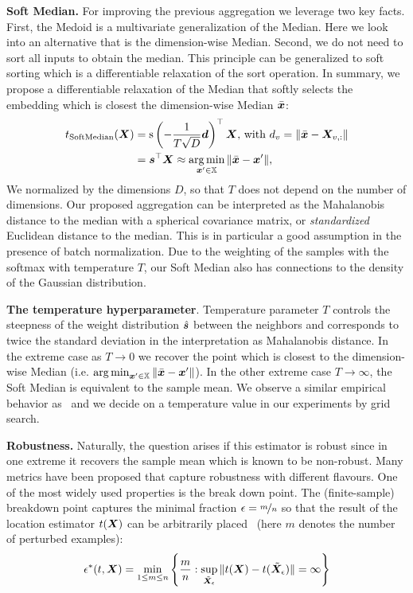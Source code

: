 \documentclass[sigconf, review]{acmart}
\newcommand{\features}{\mX}
\newcommand{\featset}{\sX}
\newcommand{\softout}{\vs}
\newcommand{\pertm}{\tilde{\mX}_\epsilon}
\begin{document}
\textbf{Soft Median.} For improving the previous aggregation we leverage two key facts. First, the Medoid is a multivariate generalization of the Median. Here we look into an alternative that is the dimension-wise Median. Second, we do not need to sort all inputs to obtain the median. This principle can be generalized to soft sorting which is a differentiable relaxation of the sort operation. In summary, we propose a differentiable relaxation of the Median that softly selects the embedding which is closest the dimension-wise Median \(\bar{{\bm{x}}}\):
\begin{equation}\label{eq:softmedian}
  \begin{aligned}
  t_{\text{SoftMedian}}(\features)
  &= \text{s}\left(-\frac{1}{T\sqrt{D}} \vd \right)^\top \features \text{,~with}~\evd_{v} = \|\bar{\vx} - \features_{v,:}\| \\
  &= \softout^\top\features \approx \argmin_{\vx' \in \featset} \| \bar{\vx} - \vx' \|,
  \end{aligned}
\end{equation}
We normalized by the dimensions \(D\), so that \(T\) does not depend on the number of dimensions. Our proposed aggregation can be interpreted as the Mahalanobis distance to the median with a spherical covariance matrix, or \emph{standardized} Euclidean distance to the median. This is in particular a good assumption in the presence of batch normalization. Due to the weighting of the samples with the softmax with temperature $T$, our Soft Median also has connections to the density of the Gaussian distribution.

\textbf{The temperature hyperparameter}. Temperature parameter $T$ controls the steepness of the weight distribution $\hat{\softout}$ between the neighbors and corresponds to twice the standard deviation in the interpretation as Mahalanobis distance. In the extreme case as $T \to 0$ we recover the point which is closest to the dimension-wise Median (i.e. \(\argmin_{\vx' \in \featset} \| \bar{\vx} - \vx' \|\)). In the other extreme case $T\to\infty$, the Soft Median is equivalent to the sample mean. We observe a similar empirical behavior as~\citet{Geisler2020} and we decide on a temperature value in our experiments by grid search.

\textbf{Robustness.} Naturally, the question arises if this estimator is robust since in one extreme it recovers the sample mean which is known to be non-robust. Many metrics have been proposed that capture robustness with different flavours. One of the most widely used properties is the break down point. The (finite-sample) breakdown point captures the minimal fraction \(\epsilon = \nicefrac{m}{n}\) so that the result of the location estimator \(t(\features)\) can be arbitrarily placed~\citep{Donoho1983} (here \(m\) denotes the number of perturbed examples):
%
\begin{equation}\label{eq:breakdown}
  \epsilon^*(t, \features) = \min_{1 \le m \le n} \left \{ \frac{m}{n}: \sup_{\pertm} \|t(\features)-t(\pertm)\| = \infty \right \}
\end{equation}
%
\end{document}
